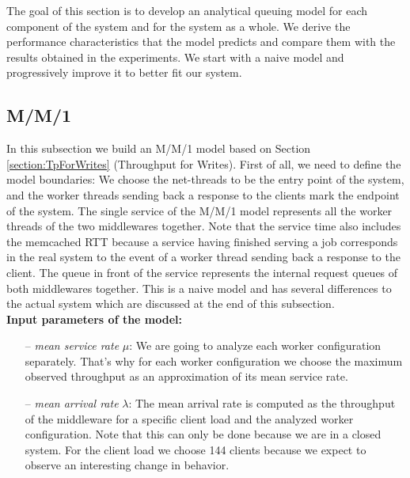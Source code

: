 The goal of this section is to develop an analytical queuing model for each component of the system and for the system as a whole. We derive the performance characteristics that the model predicts and compare them with the results obtained in the experiments. We start with a naive model and progressively improve it to better fit our system. 

\subsection{M/M/1}
In this subsection we build an M/M/1 model based on Section \ref{section:TpForWrites} (Throughput for Writes). 
First of all, we need to define the model boundaries: We choose the net-threads to be the entry point of the system, and the worker threads sending back a response to the clients mark the endpoint of the system. 
The single service of the M/M/1 model represents all the worker threads of the two middlewares together. Note that the service time also includes the memcached RTT because a service having finished serving a job corresponds in the real system to the event of a worker thread sending back a response to the client. The queue in front of the service represents the internal request queues of both middlewares together. 
This is a naive model and has several differences to the actual system which are discussed at the end of this subsection. \\

\textbf{Input parameters of the model:} %
\begin{itemize}
\item[--] \textit{mean service rate }$\mu$: We are going to analyze each worker configuration separately. That's why for each worker configuration we choose the maximum observed throughput as an approximation of its mean service rate.
\item[--] \textit{mean arrival rate} $\lambda$: The mean arrival rate is computed as the throughput of the middleware for a specific client load and the analyzed worker configuration. Note that this can only be done because we are in a closed system. For the client load we choose 144 clients because we expect to observe an interesting change in behavior.
\end{itemize}

